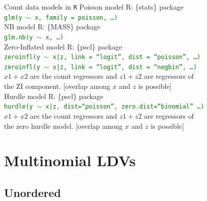 \documentclass[usenames,dvipsnames]{beamer}
\begin{document}
\begin{frame}{Count data models in  \texttt{R}}
Poisson model \qquad \qquad R: \{stats\} package\\
\texttt{\textcolor{Green}{glm(y $\sim$ x, family = poisson, \dots )}}\\
\vspace*{.4cm}
NB model \qquad \qquad \qquad R: \{MASS\} package\\
\texttt{\textcolor{Green}{glm.nb(y $\sim$ x, \dots)}} \\
\vspace*{.4cm}
Zero-Inflated model \qquad R: \{pscl\} package\\
\small{\texttt{\textcolor{Green}{zeroinfl(y $\sim$ x|z, link = ``logit'', dist = ``poisson'', \dots)}}} \\
\small{\texttt{\texttt{\textcolor{Green}{zeroinfl(y $\sim$ x|z, link = ``logit'', dist = ``negbin'', \dots)}}}} \\
\qquad $x1+x2$ are the count regressors and $z1+z2$ are regressors of\\ 
\qquad the ZI component. $[$overlap among $x$ and $z$ is possible$]$\\
\vspace*{.4cm}
Hurdle model \qquad \qquad \qquad R: \{pscl\} package\\
\small{\texttt{\textcolor{Green}{hurdle(y $\sim$ x|z, dist=``poisson'', zero.dist=``binomial'' \dots)}}} \\
\qquad $x1+x2$ are the count regressors and $z1+z2$ are regressors of\\ 
\qquad the zero hurdle model. $[$overlap among $x$ and $z$ is possible$]$
\end{frame}
\section{Multinomial LDVs}

\subsection{Unordered}
\end{document}
